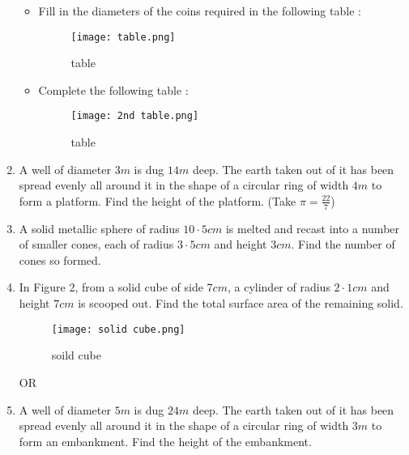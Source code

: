 \documentclass{article}
\begin{document}
\begin{enumerate}
    \begin{itemize}
     \item   Fill in the diameters of the coins required in the following table :
    \begin{figure}[H]
        \centering
        \texttt{[image: table.png]}
        \caption{table}
        \label{fig:enter-label}
    \end{figure}
    \item Complete the following table :
\begin{figure}[H]
    \centering
    \texttt{[image: 2nd table.png]}
    \caption{table}
    \label{fig:enter-label}
\end{figure}
\end{itemize}
\newpage
\item A well of diameter $3 m$ is dug $14 m$ deep. The earth 
       taken out of it has been spread evenly all around it in the shape of a circular ring of width
        $4 m$ to form a platform. Find the height of the platform. (Take $\pi=\frac{22}{7}$)

\item  A solid metallic sphere of radius $10\cdot5 cm$ is melted and recast into a number of smaller cones, each of radius $3\cdot5 cm$ and height $3 cm$. Find the number of cones so formed.

\item  In Figure 2, from a solid cube of side $7 cm$, a cylinder of radius $2\cdot1 cm$ and height $7 cm$ is scooped out. Find the total surface area of the remaining solid.
\begin{figure}[H]
\centering
\texttt{[image: solid cube.png]}
\caption{soild cube}
\label{fig:enter-label}
\end{figure}
\begin{center}
    OR
\end{center}
\item  A well of diameter $5 m$ is dug $24 m$ deep. The earth taken out of it has been spread evenly all around it in the shape of a circular ring of width $3 m$ to form an embankment. Find the height of the embankment.


\end{enumerate}
\end{document}
